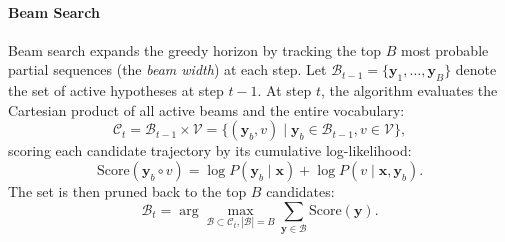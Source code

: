 \documentclass[../../main.tex]{subfiles}
\begin{document}
\paragraph{Beam Search}
Beam search expands the greedy horizon by tracking the top $B$ most probable partial sequences (the \emph{beam width}) at each step. Let $\mathcal{B}_{t-1} = \{\mathbf{y}_1, \dots, \mathbf{y}_B\}$ denote the set of active hypotheses at step $t-1$. At step $t$, the algorithm evaluates the Cartesian product of all active beams and the entire vocabulary:
\begin{equation}
\mathcal{C}_t = \mathcal{B}_{t-1} \times \mathcal{V} = \{(\mathbf{y}_b, v) \mid \mathbf{y}_b \in \mathcal{B}_{t-1}, v \in \mathcal{V}\},
\label{eq:beam_candidate_set}
\end{equation}
scoring each candidate trajectory by its cumulative log-likelihood:
\begin{equation}
\text{Score}(\mathbf{y}_b \circ v) = \log P(\mathbf{y}_b \mid \mathbf{x}) + \log P(v \mid \mathbf{x}, \mathbf{y}_b).
\label{eq:beam_search_log_score}
\end{equation}
The set is then pruned back to the top $B$ candidates:
\begin{equation}
\mathcal{B}_t = \arg\max_{\mathcal{B} \subset \mathcal{C}_t, |\mathcal{B}|=B} \sum_{\mathbf{y} \in \mathcal{B}} \text{Score}(\mathbf{y}).
\label{eq:beam_search_prune}
\end{equation}
\end{document}
